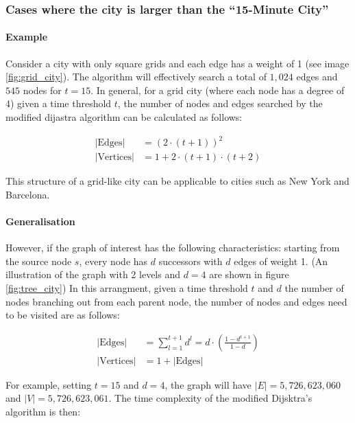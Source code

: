 \subsubsection{Cases where the city is larger than the ``15-Minute City''}

\paragraph{Example}

Consider a city with only square grids and each edge has a weight of 1 (see image \ref{fig:grid_city}). The algorithm will effectively search a total of $1,024$ edges and $545$ nodes for $t=15$. In general, for a grid city (where each node has a degree of 4) given a time threshold $t$, the number of nodes and edges searched by the modified dijastra algorithm can be calculated as follows:

$$
\begin{aligned}
    |\text{Edges}|&=(2\cdot(t+1))^2\\
    |\text{Vertices}|&=1+2\cdot(t+1)\cdot(t+2)
\end{aligned}
$$

This structure of a grid-like city can be applicable to cities such as New York and Barcelona.

\paragraph{Generalisation}

However, if the graph of interest has the following characteristics: starting from the source node $s$, every node has $d$ successors with $d$ edges of weight 1. (An illustration of the graph with 2 levels and $d = 4$ are shown in figure \ref{fig:tree_city}) In this arrangment, given a time threshold $t$ and $d$ the number of nodes branching out from each parent node, the number of nodes and edges need to be visited are as follows:

$$
\begin{aligned}
    |\text{Edges}|&=\sum_{l=1}^{t+1} d^l=d\cdot\left(\frac{1-d^{t+1}}{1-d}\right)\\
    |\text{Vertices}|&=1+|\text{Edges}|
\end{aligned}
$$

For example, setting $t=15$ and $d=4$, the graph will have $|E|=5,726,623,060$ and $|V|=5,726,623,061$. The time complexity of the modified Dijsktra's algorithm is then:

